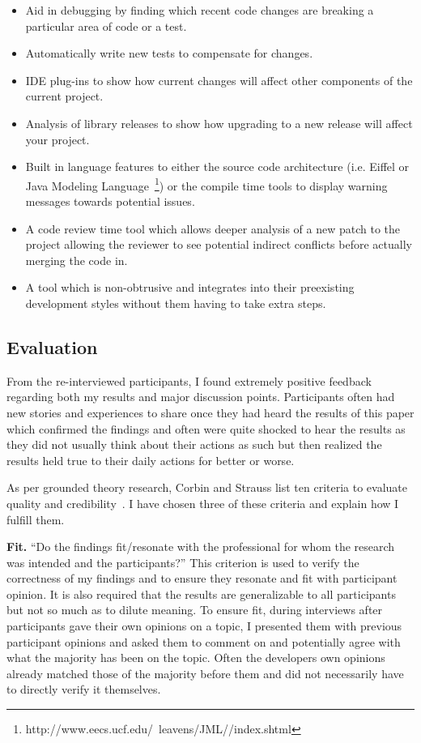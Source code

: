 \begin{itemize}
        \item Aid in debugging by finding which recent code changes are breaking a particular area of code or a test.
        \item Automatically write new tests to compensate for changes.
        \item IDE plug-ins to show how current changes will affect other components of the current project.
        \item Analysis of library releases to show how upgrading to a new release will affect your project.
        \item Built in language features to either the source code architecture (i.e. Eiffel or 
                                Java Modeling Language~\footnote{http://www.eecs.ucf.edu/~leavens/JML//index.shtml}) or the compile 
                                time tools to display warning messages towards potential issues.
        \item A code review time tool which allows deeper analysis of a new patch to the project allowing the reviewer to see potential 
                                indirect conflicts before actually merging the code in.
        \item A tool which is non-obtrusive and integrates into their preexisting development styles without them having to take extra steps.
\end{itemize}

\subsection{Evaluation}
\label{sec:exp-eval}

From the re-interviewed participants, I found extremely positive feedback regarding both my results and major discussion
points. Participants often had new stories and experiences to share once they had heard the results of this paper which
confirmed the findings and often were quite shocked to hear the results as they did not usually think about their actions
as such but then realized the results held true to their daily actions for better or worse.

As per grounded theory research, Corbin and Strauss list ten criteria to evaluate quality and credibility~\cite{Corbin:1998:SP}.
I have chosen three of these criteria and explain how I fulfill them.

{\bfseries Fit.} ``Do the findings fit/resonate with the professional for whom the research was intended and the participants?'' This
criterion is used to verify the correctness of my findings and to ensure they resonate and fit with participant opinion. It is also
required that the results are generalizable to all participants but not so much as to dilute meaning. To ensure fit, during interviews
after participants gave their own opinions on a topic, I presented them with previous participant opinions and asked them to comment
on and potentially agree with what the majority has been on the topic. Often the developers own opinions already matched those of
the majority before them and did not necessarily have to directly verify it themselves.

